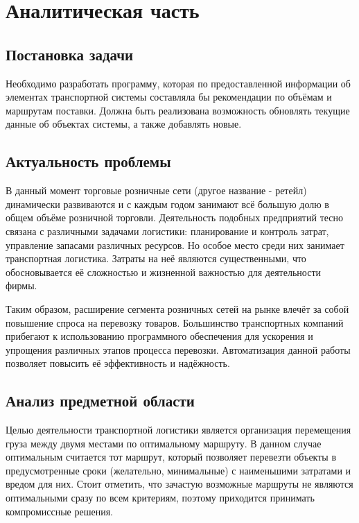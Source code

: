 \section{Аналитическая часть}

\subsection{Постановка задачи}
Необходимо разработать программу, которая по предоставленной информации об элементах транспортной системы составляла бы рекомендации по объёмам и маршрутам поставки.
Должна быть реализована возможность обновлять текущие данные об объектах системы, а также добавлять новые.

\subsection{Актуальность проблемы}
В данный момент торговые розничные сети (другое название - ретейл) динамически развиваются и с каждым годом занимают всё большую долю в общем объёме розничной торговли\cite{subj:demand}. Деятельность подобных предприятий тесно связана с различными задачами логистики: планирование и контроль затрат, управление запасами различных ресурсов. Но особое место среди них занимает транспортная логистика. Затраты на неё являются существенными, что обосновывается её сложностью и жизненной важностью для деятельности фирмы. 

Таким образом, расширение сегмента розничных сетей на рынке влечёт за собой повышение спроса на перевозку товаров. Большинство транспортных компаний прибегают к использованию программного обеспечения для ускорения и упрощения различных этапов процесса перевозки\cite{subj:auto_eff}.  Автоматизация данной работы позволяет повысить её эффективность и надёжность.

\subsection{Анализ предметной области}
Целью деятельности транспортной логистики является организация перемещения груза между двумя местами по оптимальному маршруту\cite{subj:main}. В данном случае оптимальным считается тот маршрут, который позволяет перевезти объекты в предусмотренные сроки (желательно, минимальные) с наименьшими затратами и вредом для них. Стоит отметить, что зачастую возможные маршруты не являются оптимальными сразу по всем критериям, поэтому приходится принимать компромиссные решения.

